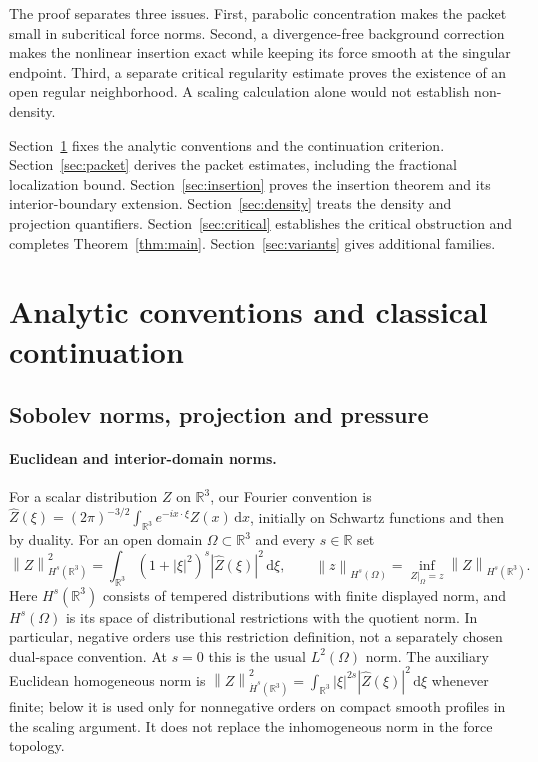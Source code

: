 \documentclass[11pt,a4paper]{article}
\theoremstyle{definition}\newtheorem{definition}[theorem]{Definition}
\theoremstyle{remark}\newtheorem{remark}[theorem]{Remark}
\newcommand{\R}{\mathbb R}\newcommand{\TT}{\mathbb T^3}
\newcommand{\dd}{\,\mathrm d}\newcommand{\eps}{\varepsilon}
\newcommand{\norm}[1]{\left\lVert#1\right\rVert}
\begin{document}
The proof separates three issues. First, parabolic concentration makes the packet small in subcritical force norms. Second, a divergence-free background correction makes the nonlinear insertion exact while keeping its force smooth at the singular endpoint. Third, a separate critical regularity estimate proves the existence of an open regular neighborhood. A scaling calculation alone would not establish non-density.

Section~\ref{sec:analytic} fixes the analytic conventions and the continuation criterion. Section~\ref{sec:packet} derives the packet estimates, including the fractional localization bound. Section~\ref{sec:insertion} proves the insertion theorem and its interior-boundary extension. Section~\ref{sec:density} treats the density and projection quantifiers. Section~\ref{sec:critical} establishes the critical obstruction and completes Theorem~\ref{thm:main}. Section~\ref{sec:variants} gives additional families.

\section{Analytic conventions and classical continuation}\label{sec:analytic}
\subsection{Sobolev norms, projection and pressure}
\paragraph{Euclidean and interior-domain norms.}
For a scalar distribution $Z$ on $\R^3$, our Fourier convention is
$\widehat Z(\xi)=(2\pi)^{-3/2}\int_{\R^3}e^{-ix\cdot\xi}Z(x)\dd x$,
initially on Schwartz functions and then by duality. For an open domain
$\Omega\subset\R^3$ and every $s\in\R$ set
\begin{equation}\label{eq:restriction-norm}
 \norm{Z}_{H^s(\R^3)}^2
 =\int_{\R^3}(1+|\xi|^2)^s|\widehat Z(\xi)|^2\dd\xi,
 \qquad
 \norm{z}_{H^s(\Omega)}
 =\inf_{Z|_\Omega=z}\norm{Z}_{H^s(\R^3)}.
\end{equation}
Here $H^s(\R^3)$ consists of tempered distributions with finite displayed
norm, and $H^s(\Omega)$ is its space of distributional restrictions with the
quotient norm. In particular, negative orders use this restriction definition,
not a separately chosen dual-space convention. At $s=0$ this is the usual
$L^2(\Omega)$ norm. The auxiliary Euclidean homogeneous norm is
$\norm{Z}_{\dot H^s(\R^3)}^2=\int_{\R^3}|\xi|^{2s}|\widehat Z(\xi)|^2\dd\xi$
whenever finite; below it is used only for nonnegative orders on compact smooth
profiles in the scaling argument. It does not replace the inhomogeneous norm
in the force topology.
\end{document}
